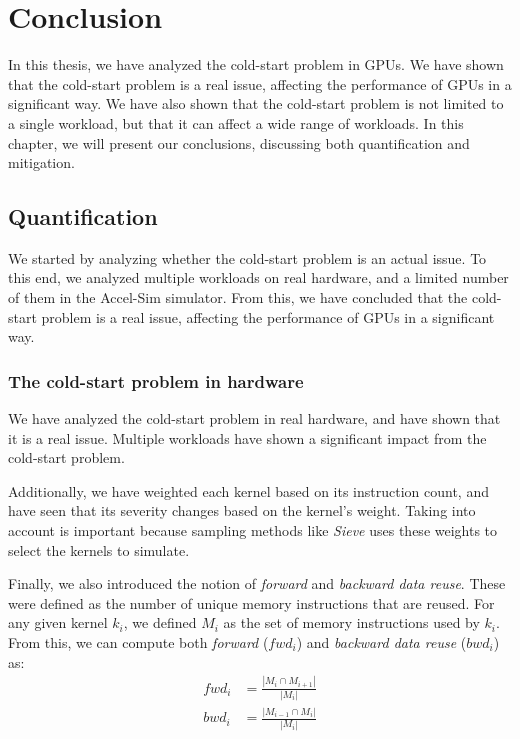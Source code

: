 \chapter{Conclusion}\label{ch:conclusion}

In this thesis, we have analyzed the cold-start problem in GPUs.
We have shown that the cold-start problem is a real issue, affecting the performance of GPUs in a significant way.
We have also shown that the cold-start problem is not limited to a single workload, but that it can affect a wide range of workloads.
In this chapter, we will present our conclusions, discussing both quantification and mitigation.

\section{Quantification}\label{sec:quantification}
We started by analyzing whether the cold-start problem is an actual issue.
To this end, we analyzed multiple workloads on real hardware, and a limited number of them in the Accel-Sim simulator.
From this, we have concluded that the cold-start problem is a real issue, affecting the performance of GPUs in a significant way.

\subsection{The cold-start problem in hardware}\label{subsec:cold-start-in-hardware}
We have analyzed the cold-start problem in real hardware, and have shown that it is a real issue.
Multiple workloads have shown a significant impact from the cold-start problem.

Additionally, we have weighted each kernel based on its instruction count, and have seen that its severity changes based on the kernel's weight.
Taking into account is important because sampling methods like \textit{Sieve} uses these weights to select the kernels to simulate.

Finally, we also introduced the notion of \textit{forward} and \textit{backward data reuse}.
These were defined as the number of unique memory instructions that are reused.
For any given kernel $k_i$, we defined $M_i$ as the set of memory instructions used by $k_i$.
From this, we can compute both \textit{forward} ($fwd_i$) and \textit{backward data reuse} ($bwd_i$) as:
\begin{align}
    fwd_i &= \frac{|M_i \cap M_{i+1}|}{|M_i|} \\
    bwd_i &= \frac{|M_{i-1} \cap M_i|}{|M_i|}
\end{align}

